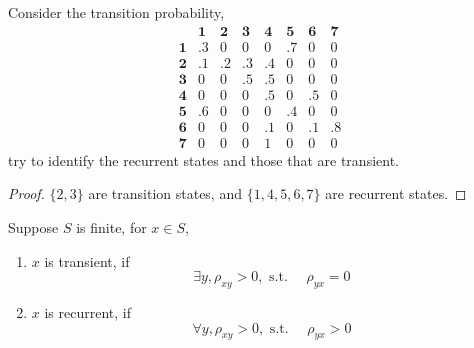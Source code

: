 \begin{example}
	Consider the transition probability,
	\begin{equation*}
		\begin{array}{cccccccc}
			           & \mathbf{1} & \mathbf{2} & \mathbf{3} & \mathbf{4} & \mathbf{5} & \mathbf{6} & \mathbf{7} \\
			\mathbf{1} & .3         & 0          & 0          & 0          & .7         & 0          & 0          \\
			\mathbf{2} & .1         & .2         & .3         & .4         & 0          & 0          & 0          \\
			\mathbf{3} & 0          & 0          & .5         & .5         & 0          & 0          & 0          \\
			\mathbf{4} & 0          & 0          & 0          & .5         & 0          & .5         & 0          \\
			\mathbf{5} & .6         & 0          & 0          & 0          & .4         & 0          & 0          \\
			\mathbf{6} & 0          & 0          & 0          & .1         & 0          & .1         & .8         \\
			\mathbf{7} & 0          & 0          & 0          & 1          & 0          & 0          & 0
		\end{array}
	\end{equation*}
	try to identify the recurrent states and those that are transient.
\end{example}

\begin{proof}
	$\{2,3\}$ are transition states, and $\{1,4,5,6,7\}$ are recurrent states.
\end{proof}

\begin{remark}
	Suppose $S$ is finite, for $x\in S$,
	\begin{enumerate}
		\item $x$ is transient, if
		      \begin{equation*}
			      \exists y,\rho_{xy}>0,\text{ s.t. }\quad\rho_{yx}=0
		      \end{equation*}
		\item $x$ is recurrent, if
		      \begin{equation*}
			      \forall y,\rho_{xy}>0,\text{ s.t. }\quad\rho_{yx}>0
		      \end{equation*}
	\end{enumerate}
\end{remark}

